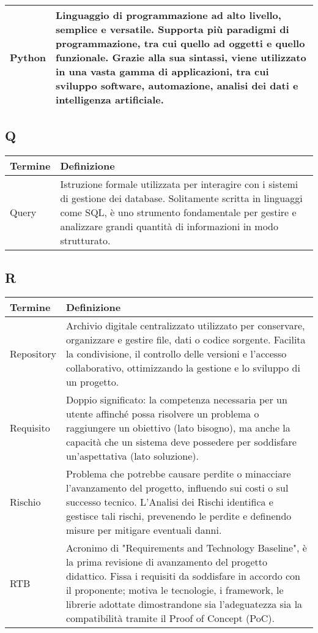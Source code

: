 \documentclass[10pt]{article}
\begin{document}
\begin{longtable}{|>{\centering\arraybackslash}m{2.5cm}|>{\arraybackslash}m{12.5cm}|}
\hline
Python & Linguaggio di programmazione ad alto livello, semplice e versatile. Supporta più paradigmi di programmazione, tra cui quello ad oggetti e quello funzionale. Grazie alla sua sintassi, viene utilizzato in una vasta gamma di applicazioni, tra cui sviluppo software, automazione, analisi dei dati e intelligenza artificiale.\\
\hline
\end{longtable}

\subsection{Q} %
\begin{longtable}{|>{\centering\arraybackslash}m{2.5cm}|>{\arraybackslash}m{12.5cm}|}
\hline
\rowcolor[gray]{0.8}
\textbf{Termine} & \textbf{Definizione}\\
\endhead
\hline
Query & Istruzione formale utilizzata per interagire con i sistemi di gestione dei database. Solitamente scritta in linguaggi come SQL, è uno strumento fondamentale per gestire e analizzare grandi quantità di informazioni in modo strutturato.\\
\hline
\end{longtable}

\subsection{R} %
\begin{longtable}{|>{\centering\arraybackslash}m{2.5cm}|>{\arraybackslash}m{12.5cm}|}
\hline
\rowcolor[gray]{0.8}
\textbf{Termine} & \textbf{Definizione}\\
\endhead
\hline
Repository & Archivio digitale centralizzato utilizzato per conservare, organizzare e gestire file, dati o codice sorgente. Facilita la condivisione, il controllo delle versioni e l'accesso collaborativo, ottimizzando la gestione e lo sviluppo di un progetto.\\
\hline
Requisito & Doppio significato: la competenza necessaria per un utente affinché possa risolvere un problema o raggiungere un obiettivo (lato bisogno), ma anche la capacità che un sistema deve possedere per soddisfare un'aspettativa (lato soluzione).\\
\hline
Rischio & Problema che potrebbe causare perdite o minacciare l'avanzamento del progetto, influendo sui costi o sul successo tecnico. L'Analisi dei Rischi identifica e gestisce tali rischi, prevenendo le perdite e definendo misure per mitigare eventuali danni.\\
\hline
RTB & Acronimo di "Requirements and Technology Baseline", è la prima revisione di avanzamento del progetto didattico. Fissa i requisiti da soddisfare in accordo con il proponente; motiva le tecnologie, i framework, le librerie adottate dimostrandone sia l'adeguatezza sia la compatibilità tramite il Proof of Concept (PoC).\\
\hline
\end{longtable}
\end{document}
